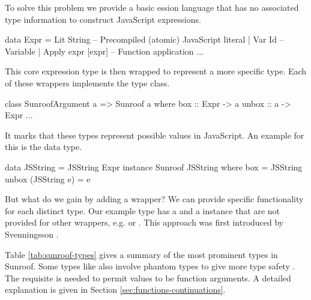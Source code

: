 To solve this problem we provide a basic ession 
language that has no associated type information to construct 
JavaScript expressions.
\begin{Code}
data Expr 
  = Lit String -- Precompiled (atomic) JavaScript literal
  | Var Id     -- Variable
  | Apply expr [expr]    -- Function application
  ...
\end{Code}
This core expression type is then wrapped to represent a more specific 
type. Each of these wrappers implements the  type 
class.
\begin{Code}
class SunroofArgument a => Sunroof a where
  box :: Expr -> a
  unbox :: a -> Expr
  ...
\end{Code}
It marks that these types represent possible values in JavaScript.
An example for this is the  data type.
\begin{Code}
data JSString = JSString Expr
instance Sunroof JSString where
  box = JSString
  unbox (JSString e) = e
\end{Code}
But what do we gain by adding a wrapper? We can
provide specific functionality for each distinct type.
Our example type  has a  and a 
 instance that are not provided for other 
wrappers, e.g.  or .
This approach was first introduced by 
Svenningsson \cite{Svenningsson:12:CombiningEmbedding}.

Table \ref{tab:sunroof-types} gives a summary of the 
most prominent types in Sunroof. Some types like  also involve 
phantom types to give more type safety .
The requisite  is needed to permit values
to be function arguments. A detailed explanation is given in 
Section \ref{sec:functions-continuations}.





